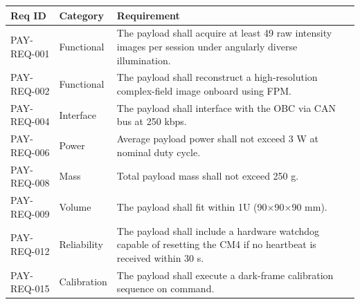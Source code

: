 \begin{longtable}{L{2.5cm}L{2.2cm}L{8cm}}
\toprule
\textbf{Req ID} & \textbf{Category} & \textbf{Requirement} \\
\midrule
PAY-REQ-001 & Functional & The payload shall acquire at least 49 raw intensity images per session under angularly diverse illumination. \\
PAY-REQ-002 & Functional & The payload shall reconstruct a high-resolution complex-field image onboard using FPM. \\
PAY-REQ-004 & Interface & The payload shall interface with the OBC via CAN bus at 250 kbps. \\
PAY-REQ-006 & Power & Average payload power shall not exceed 3 W at nominal duty cycle. \\
PAY-REQ-008 & Mass & Total payload mass shall not exceed 250 g. \\
PAY-REQ-009 & Volume & The payload shall fit within 1U (90$\times$90$\times$90 mm). \\
PAY-REQ-012 & Reliability & The payload shall include a hardware watchdog capable of resetting the CM4 if no heartbeat is received within 30 s. \\
PAY-REQ-015 & Calibration & The payload shall execute a dark-frame calibration sequence on command. \\
\bottomrule
\end{longtable}
